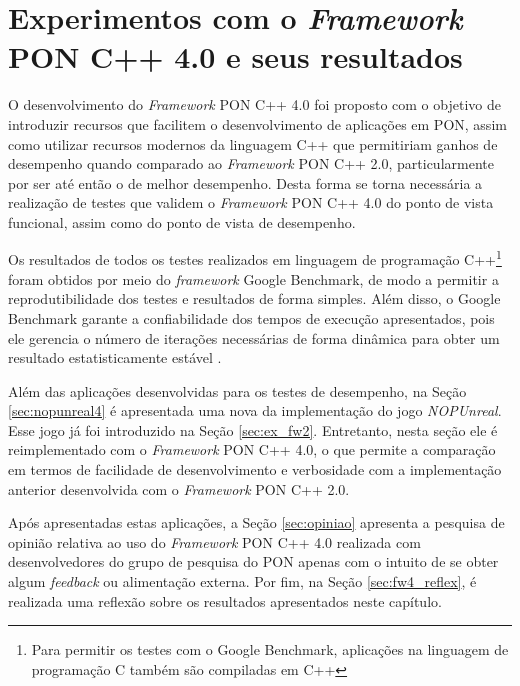 \chapter{Experimentos com o \textit{Framework} PON C++ 4.0 e seus resultados}\label{ch:result}

O desenvolvimento do \textit{Framework} PON C++ 4.0 foi proposto com o objetivo
de introduzir recursos que facilitem o desenvolvimento de aplicações em PON,
assim como utilizar recursos modernos da linguagem C++ que permitiriam ganhos de
desempenho quando comparado ao \textit{Framework} PON C++ 2.0, particularmente
por ser até então o de melhor desempenho. Desta forma se torna necessária a
realização de testes que validem o \textit{Framework} PON C++ 4.0 do ponto de
vista funcional, assim como do ponto de vista de desempenho.


Os resultados de todos os testes realizados em linguagem de programação
C++\footnote{Para permitir os testes com o Google Benchmark, aplicações na
linguagem de programação C também são compiladas em C++} foram obtidos por meio
do \textit{framework} Google Benchmark, de modo a permitir a reprodutibilidade
dos testes e resultados de forma simples. Além disso, o Google Benchmark garante
a confiabilidade dos tempos de execução apresentados, pois ele gerencia o número
de iterações necessárias de forma dinâmica para obter um resultado
estatisticamente estável \cite{google_benchmark}.

Além das aplicações desenvolvidas para os testes de desempenho, na Seção
\ref{sec:nopunreal4} é apresentada uma nova da implementação do jogo
\textit{NOPUnreal}. Esse jogo já foi introduzido na Seção \ref{sec:ex_fw2}.
Entretanto, nesta seção ele é reimplementado com o \textit{Framework} PON C++
4.0, o que permite a comparação em termos de facilidade de desenvolvimento e
verbosidade com a implementação anterior desenvolvida com o \textit{Framework}
PON C++ 2.0.

Após apresentadas estas aplicações, a Seção \ref{sec:opiniao} apresenta a
pesquisa de opinião relativa ao uso do \textit{Framework} PON C++ 4.0 realizada
com desenvolvedores do grupo de pesquisa do PON apenas com o intuito de se obter
algum \textit{feedback} ou alimentação externa. Por fim, na Seção
\ref{sec:fw4_reflex}, é realizada uma reflexão sobre os resultados apresentados
neste capítulo.

